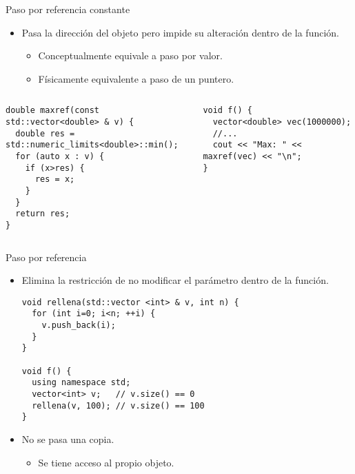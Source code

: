 \begin{frame}[t,fragile]{Paso por referencia constante}
\begin{itemize}
\item Pasa la dirección del objeto pero impide su 
      alteración dentro de la función.
  \begin{itemize}
    \item Conceptualmente equivale a paso por valor.
    \item Físicamente equivalente a paso de un puntero.
  \end{itemize}
\end{itemize}

\begin{columns}[T]

\begin{lstlisting}
double maxref(const std::vector<double> & v) {
  double res = std::numeric_limits<double>::min();
  for (auto x : v) {
    if (x>res) {
      res = x;
    }
  }
  return res;
}
\end{lstlisting}

\begin{lstlisting}
void f() {
  vector<double> vec(1000000);
  //...
  cout << "Max: " << maxref(vec) << "\n";
}
\end{lstlisting}

\end{columns}
\end{frame}

\begin{frame}[t,fragile]{Paso por referencia}
\begin{itemize}
  \item Elimina la restricción de no modificar el parámetro dentro de la función.
\begin{lstlisting}
void rellena(std::vector <int> & v, int n) {
  for (int i=0; i<n; ++i) {
    v.push_back(i);
  } 
}

void f() {
  using namespace std;
  vector<int> v;   // v.size() == 0
  rellena(v, 100); // v.size() == 100
}
\end{lstlisting}

  \vfill
  \item No se pasa una copia.
    \begin{itemize}
      \item Se tiene acceso al propio objeto.
    \end{itemize}
\end{itemize}
\end{frame}
